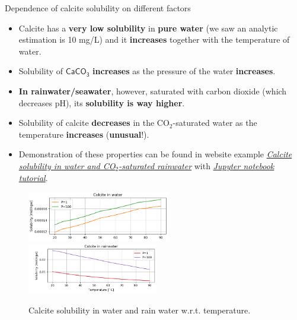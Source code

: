 \begin{frame}{Dependence of calcite solubility on different factors}
\small
\begin{itemize}
\item Calcite has a \textbf{very low solubility} in \textbf{pure water} (we saw an analytic estimation is 10 \mbox{mg/L}) and it \textbf{increases} together with the temperature of water.
\pause
\item Solubility of $\mathsf{CaCO_3}$ \textbf{increases} as the pressure of the water \textbf{increases}.
\pause
\item \textbf{In rainwater/seawater}, however, saturated with carbon dioxide (which decreases pH), its \textbf{solubility is way higher}.
\pause
\item Solubility of calcite \textbf{decreases} in the CO$_2$-saturated water  as the temperature \textbf{increases} ({\bf unusual}!).
\pause
\item Demonstration of these properties can be found in website example 
\href{https://reaktoro.org/applications/solubility/solubility-calcite-on-acidity-and-temperature.html}{\textcolor{indigo(dye)}{\it Calcite solubility in water and CO$_2$-saturated rainwater}} with \href{https://github.com/mtsveta/reaktoro-v2-workshop/blob/main/tutorials/solubility/solubility-calcite-in-water-rainwater.ipynb}{\textcolor{indigo(dye)}{\it Jupyter notebook tutorial}}.
%
%
%
\end{itemize}

\begin{figure}\centering
	\includegraphics[height=2.2cm]{figures/chemical-equilibrium/calcite-solubility-water.png} \quad
	\includegraphics[height=2.2cm]{figures/chemical-equilibrium/calcite-solubility-rainwater.png}
	\caption*{\footnotesize Calcite solubility in water and rain water w.r.t. temperature.}
\end{figure}
\end{frame}

